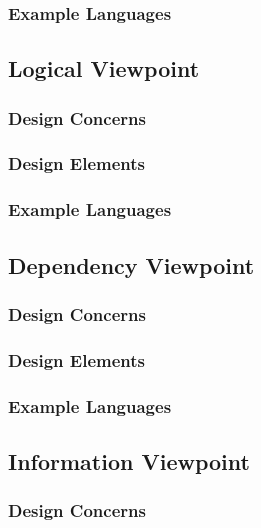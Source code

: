 \documentclass[onecolumn, draftclsnofoot,10pt, compsoc]{IEEEtran}
\begin{document}
\subsubsection{Example Languages}

\subsection{Logical Viewpoint}
\subsubsection{Design Concerns}

\subsubsection{Design Elements}

\subsubsection{Example Languages}

\subsection{Dependency Viewpoint}
\subsubsection{Design Concerns}

\subsubsection{Design Elements}

\subsubsection{Example Languages}

\subsection{Information Viewpoint}
\subsubsection{Design Concerns}
\end{document}
